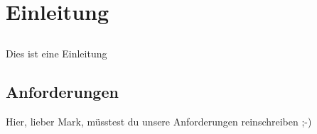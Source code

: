 \chapter{Einleitung}\label{ch:einleitung}

\section{}

Dies ist eine Einleitung

\section{Anforderungen}

Hier, lieber Mark, müsstest du unsere Anforderungen reinschreiben ;-)


